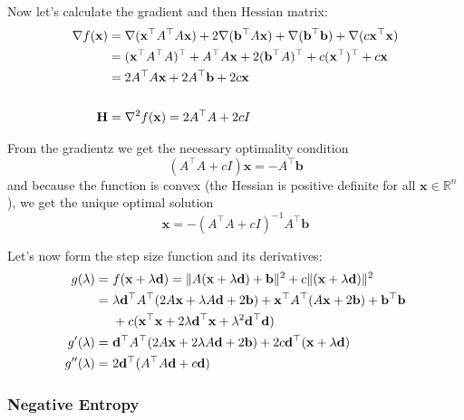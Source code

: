 \documentclass[a4paper,english,titlepage,12pt]{article}
\newcommand{\vect}[1]{\ensuremath{\mathbf{#1}}}
\newcommand{\trans}[1]{\ensuremath\vect{#1}^\top}
\newcommand{\norm}[1]{\ensuremath\Vert #1 \Vert}
\begin{document}
Now let's calculate the gradient and then Hessian matrix:
\begin{align}
    \nabla f(\vect{x}) &= \nabla(\trans{x} A^\top A \vect{x}) + 2 \nabla(\trans{b} A \vect{x}) + \nabla(\trans{b} \vect{b}) + \nabla(c \trans{x} \vect{x}) \nonumber \\
    &= (\trans{x} A^\top A)^\top + A^\top A \vect{x} + 2 (\trans{b} A)^\top + c (\trans{x})^\top + c \vect{x} \nonumber \\
    &= 2 A^\top A \vect{x} + 2 A^\top \vect{b} + 2 c \vect{x} \\
    &\nonumber \\
    \textbf{H} &= \nabla^2 f(\vect{x}) = 2 A^\top A + 2 c I
\end{align}

From the gradientz we get the necessary optimality condition
\begin{equation}
    (A^\top A + c I) \vect{x} = - A^\top \vect{b}
\end{equation}
and because the function is convex (the Hessian is positive definite for all $\vect{x} \in \mathbb{R}^n$), we get the unique optimal solution
\begin{equation}
    \vect{x} = - (A^\top A + c I)^{-1} A^\top \vect{b}
\end{equation}

Let's now form the step size function and its derivatives:
\begin{align}
    g(\lambda) =\ &f(\vect{x} + \lambda \vect{d}) = \norm{A (\vect{x} + \lambda \vect{d}) + \vect{b}} ^ 2 + c \norm{(\vect{x} + \lambda \vect{d})} ^ 2 \nonumber \\
    =\ &\lambda \trans{d} A^\top ( 2 A \vect{x} + \lambda A \vect{d} + 2 \vect{b}) + \trans{x} A^\top ( A \vect{x} + 2 \vect{b} ) + \trans{b} \vect{b} \\
    &+ c ( \trans{x} \vect{x} + 2 \lambda \trans{d} \vect{x} + \lambda ^ 2 \trans{d} \vect{d}) \nonumber \\
    g'(\lambda) =\ &\trans{d} A^\top ( 2 A \vect{x} + 2 \lambda A \vect{d} + 2 \vect{b} ) + 2 c \trans{d} ( \vect{x} + \lambda \vect{d} ) \\
    g''(\lambda) =\ &2 \trans{d} ( A^\top A \vect{d} + c \vect{d})
\end{align}


\subsubsection{Negative Entropy}
\end{document}
